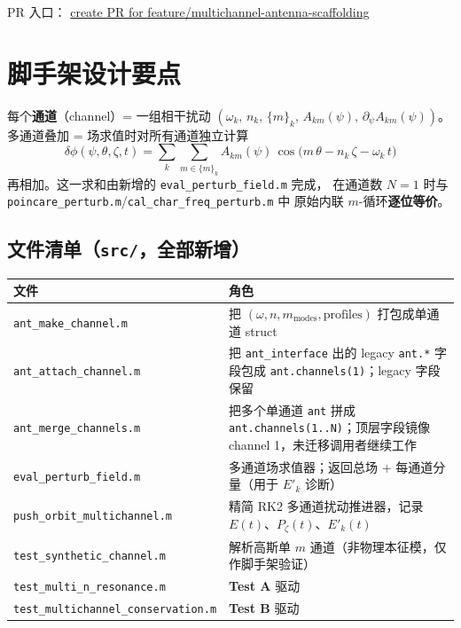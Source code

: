 \documentclass[11pt,a4paper]{article}
\begin{document}
PR 入口：
\href{https://github.com/marxtein/MOSAIC/pull/new/feature/multichannel-antenna-scaffolding}{\textsf{create PR for feature/multichannel-antenna-scaffolding}}

\section{脚手架设计要点}

每个\textbf{通道}（channel）= 一组相干扰动
$(\omega_k,\,n_k,\,\{m\}_k,\,A_{km}(\psi),\,\partial_\psi A_{km}(\psi))$。
多通道叠加 = 场求值时对所有通道独立计算
\[
  \delta\phi(\psi,\theta,\zeta,t)
  = \sum_{k} \sum_{m\in\{m\}_k}
    A_{km}(\psi)\,
    \cos\!\bigl(m\,\theta - n_k\,\zeta - \omega_k\,t\bigr)
\]
再相加。这一求和由新增的 \texttt{eval\_perturb\_field.m} 完成，
在通道数 $N{=}1$ 时与
\texttt{poincare\_perturb.m}/\texttt{cal\_char\_freq\_perturb.m} 中
原始内联 $m$-循环\textbf{逐位等价}。

\subsection{文件清单（\texttt{src/}，全部新增）}

\begin{table}[ht]
\centering
\small
\begin{tabular}{p{5.2cm} p{9.3cm}}
\toprule
文件 & 角色 \\
\midrule
\texttt{ant\_make\_channel.m}        & 把 $(\omega,n,m_{\text{modes}},\text{profiles})$ 打包成单通道 struct \\
\texttt{ant\_attach\_channel.m}      & 把 \texttt{ant\_interface} 出的 legacy \texttt{ant.*} 字段包成 \texttt{ant.channels(1)}；legacy 字段保留 \\
\texttt{ant\_merge\_channels.m}      & 把多个单通道 \texttt{ant} 拼成 \texttt{ant.channels(1..N)}；顶层字段镜像 channel 1，未迁移调用者继续工作 \\
\texttt{eval\_perturb\_field.m}      & 多通道场求值器；返回总场 + 每通道分量（用于 $E'_k$ 诊断） \\
\texttt{push\_orbit\_multichannel.m} & 精简 RK2 多通道扰动推进器，记录 $E(t)$、$P_\zeta(t)$、$E'_k(t)$ \\
\texttt{test\_synthetic\_channel.m}  & 解析高斯单 $m$ 通道（非物理本征模，仅作脚手架验证） \\
\texttt{test\_multi\_n\_resonance.m} & \textbf{Test A} 驱动 \\
\texttt{test\_multichannel\_conservation.m} & \textbf{Test B} 驱动 \\
\bottomrule
\end{tabular}
\end{table}
\end{document}
